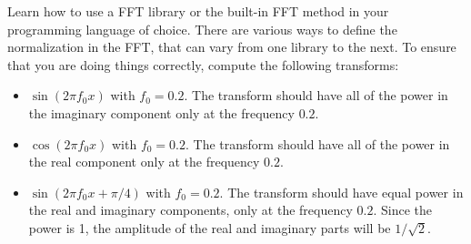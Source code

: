 \begin{exercise}[FFTs]
{Learn how to use a FFT library or the built-in FFT method in your
  programming language of choice.  There are various ways to define
  the normalization in the FFT, that can vary from one library to the
  next.  To ensure that you are doing things correctly, compute the
  following transforms:
  \begin{itemize}
  \item $\sin(2\pi f_0 x)$ with $f_0 = 0.2$.  The transform should
    have all of the power in the imaginary component only at the 
    frequency $0.2$.

  \item $\cos(2\pi f_0 x)$ with $f_0 = 0.2$.  The transform should
    have all of the power in the real component only at the 
    frequency $0.2$.

  \item $\sin(2\pi f_0 x + \pi/4)$ with $f_0 = 0.2$.  The transform should
    have equal power in the real and imaginary components, only at the 
    frequency $0.2$.  Since the power is 1, the amplitude of the real and
    imaginary parts will be $1/\sqrt{2}$.
  \end{itemize}
}
\end{exercise}

      





